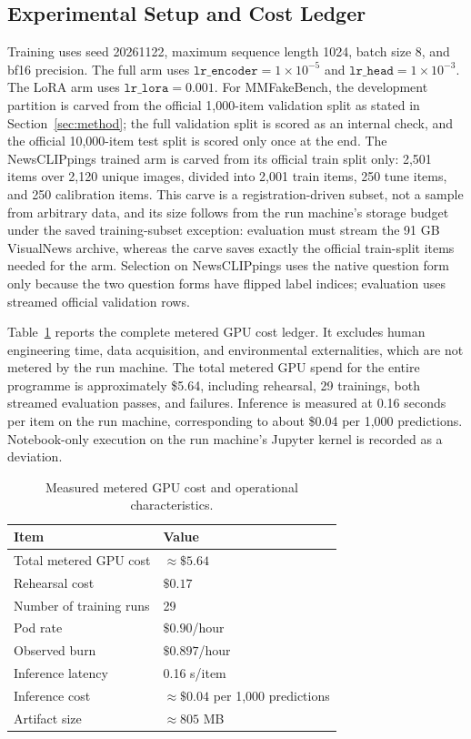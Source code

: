 \documentclass{article} %
\begin{document}
\subsection{Experimental Setup and Cost Ledger}
Training uses seed 20261122, maximum sequence length 1024, batch size 8, and bf16 precision. The full arm uses \( \texttt{lr\_encoder}=1\times10^{-5} \) and \( \texttt{lr\_head}=1\times10^{-3} \). The LoRA arm uses \( \texttt{lr\_lora}=0.001 \). For MMFakeBench, the development partition is carved from the official 1,000-item validation split as stated in Section~\ref{sec:method}; the full validation split is scored as an internal check, and the official 10,000-item test split is scored only once at the end. The NewsCLIPpings trained arm is carved from its official train split only: 2,501 items over 2,120 unique images, divided into 2,001 train items, 250 tune items, and 250 calibration items. This carve is a registration-driven subset, not a sample from arbitrary data, and its size follows from the run machine's storage budget under the saved training-subset exception: evaluation must stream the 91 GB VisualNews archive, whereas the carve saves exactly the official train-split items needed for the arm. Selection on NewsCLIPpings uses the native question form only because the two question forms have flipped label indices; evaluation uses streamed official validation rows.

Table~\ref{tab:cost} reports the complete metered GPU cost ledger. It excludes human engineering time, data acquisition, and environmental externalities, which are not metered by the run machine. The total metered GPU spend for the entire programme is approximately \$5.64, including rehearsal, 29 trainings, both streamed evaluation passes, and failures. Inference is measured at 0.16 seconds per item on the run machine, corresponding to about \$0.04 per 1,000 predictions. Notebook-only execution on the run machine's Jupyter kernel is recorded as a deviation.

\begin{table}[t]
\centering
\small
\caption{Measured metered GPU cost and operational characteristics.}
\label{tab:cost}
\begin{tabular}{ll}
\toprule
Item & Value \\
\midrule
Total metered GPU cost & \(\approx \$5.64\) \\
Rehearsal cost & \(\$0.17\) \\
Number of training runs & 29 \\
Pod rate & \(\$0.90\)/hour \\
Observed burn & \(\$0.897\)/hour \\
Inference latency & 0.16 s/item \\
Inference cost & \(\approx \$0.04\) per 1,000 predictions \\
Artifact size & \(\approx 805\) MB \\
\bottomrule
\end{tabular}
\end{table}
\end{document}
